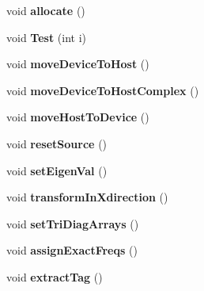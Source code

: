 \begin{DoxyCompactItemize}
\item 
\hypertarget{classFourier_a1068b8011eed399c30ae984ead4ee40d}{void {\bfseries allocate} ()}\label{classFourier_a1068b8011eed399c30ae984ead4ee40d}

\item 
\hypertarget{classFourier_a84a202b757a32983dfaaa9d5c9fb464f}{void {\bfseries Test} (int i)}\label{classFourier_a84a202b757a32983dfaaa9d5c9fb464f}

\item 
\hypertarget{classFourier_a9515a6968ff52646a0d52bd8133b74e9}{void {\bfseries move\-Device\-To\-Host} ()}\label{classFourier_a9515a6968ff52646a0d52bd8133b74e9}

\item 
\hypertarget{classFourier_ac5a5f9f7097821ba14cce0045fc66526}{void {\bfseries move\-Device\-To\-Host\-Complex} ()}\label{classFourier_ac5a5f9f7097821ba14cce0045fc66526}

\item 
\hypertarget{classFourier_af0b4a4f59c05858f63649f61cf85f694}{void {\bfseries move\-Host\-To\-Device} ()}\label{classFourier_af0b4a4f59c05858f63649f61cf85f694}

\item 
\hypertarget{classFourier_afa8177aff11aaf2ff7ce95e4348a1a4b}{void {\bfseries reset\-Source} ()}\label{classFourier_afa8177aff11aaf2ff7ce95e4348a1a4b}

\item 
\hypertarget{classFourier_aeb6973f461a7eec7f57d787f5eb3ab47}{void {\bfseries set\-Eigen\-Val} ()}\label{classFourier_aeb6973f461a7eec7f57d787f5eb3ab47}

\item 
\hypertarget{classFourier_ad6c1d93675057031fd143ce550de3f7d}{void {\bfseries transform\-In\-Xdirection} ()}\label{classFourier_ad6c1d93675057031fd143ce550de3f7d}

\item 
\hypertarget{classFourier_a933dbaa3c8da67d79d65dd36c25d5b42}{void {\bfseries set\-Tri\-Diag\-Arrays} ()}\label{classFourier_a933dbaa3c8da67d79d65dd36c25d5b42}

\item 
\hypertarget{classFourier_a80a5e595af802782a22e0a4dc038d875}{void {\bfseries assign\-Exact\-Freqs} ()}\label{classFourier_a80a5e595af802782a22e0a4dc038d875}

\item 
\hypertarget{classFourier_aaa21d527b5b4bc93cce20e1a7d5025b7}{void {\bfseries extract\-Tag} ()}\label{classFourier_aaa21d527b5b4bc93cce20e1a7d5025b7}


\end{DoxyCompactItemize}
